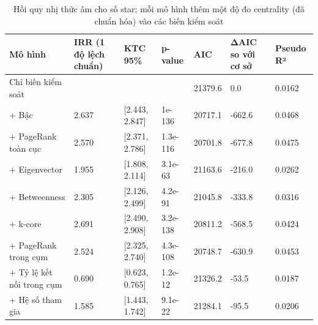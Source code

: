 \begin{table}[htbp]
\caption{Hồi quy nhị thức âm cho số star; mỗi mô hình thêm một độ đo centrality (đã chuẩn hóa) vào các biến kiểm soát}
\label{tab:rq3_nb}
\begin{tabular}{lllllll}
\toprule
Mô hình & IRR (1 độ lệch chuẩn) & KTC 95\% & p-value & AIC & ΔAIC so với cơ sở & Pseudo R² \\
\midrule
Chỉ biến kiểm soát &  &  &  & 21379.6 & 0.0 & 0.0162 \\
+ Bậc & 2.637 & [2.443, 2.847] & 1e-136 & 20717.1 & -662.6 & 0.0468 \\
+ PageRank toàn cục & 2.570 & [2.371, 2.786] & 1.3e-116 & 20701.8 & -677.8 & 0.0475 \\
+ Eigenvector & 1.955 & [1.808, 2.114] & 3.1e-63 & 21163.6 & -216.0 & 0.0262 \\
+ Betweenness & 2.305 & [2.126, 2.499] & 4.2e-91 & 21045.8 & -333.8 & 0.0316 \\
+ k-core & 2.691 & [2.490, 2.908] & 3.2e-138 & 20811.2 & -568.5 & 0.0424 \\
+ PageRank trong cụm & 2.524 & [2.325, 2.740] & 4.3e-108 & 20748.7 & -630.9 & 0.0453 \\
+ Tỷ lệ kết nối trong cụm & 0.690 & [0.623, 0.765] & 1.2e-12 & 21326.2 & -53.5 & 0.0187 \\
+ Hệ số tham gia & 1.585 & [1.443, 1.742] & 9.1e-22 & 21284.1 & -95.5 & 0.0206 \\
\bottomrule
\end{tabular}
\end{table}
